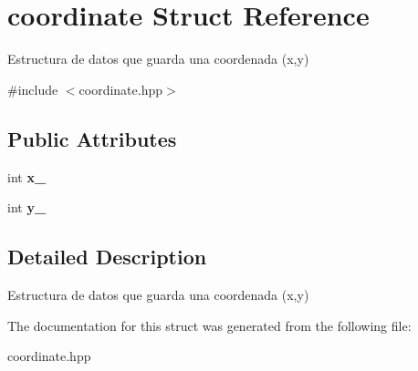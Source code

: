 \hypertarget{structcoordinate}{\section{coordinate Struct Reference}
\label{structcoordinate}
}


Estructura de datos que guarda una coordenada (x,y)  




{\ttfamily \#include $<$coordinate.\-hpp$>$}

\subsection*{Public Attributes}
\begin{DoxyCompactItemize}
\item 
\hypertarget{structcoordinate_a6c0067628b321b5d4cf576251746075c}{int {\bfseries x\-\_\-}}\label{structcoordinate_a6c0067628b321b5d4cf576251746075c}

\item 
\hypertarget{structcoordinate_a41c66408905f4945774771ba824baa49}{int {\bfseries y\-\_\-}}\label{structcoordinate_a41c66408905f4945774771ba824baa49}

\end{DoxyCompactItemize}


\subsection{Detailed Description}
Estructura de datos que guarda una coordenada (x,y) 

The documentation for this struct was generated from the following file\-:\begin{DoxyCompactItemize}
\item 
coordinate.\-hpp\end{DoxyCompactItemize}
